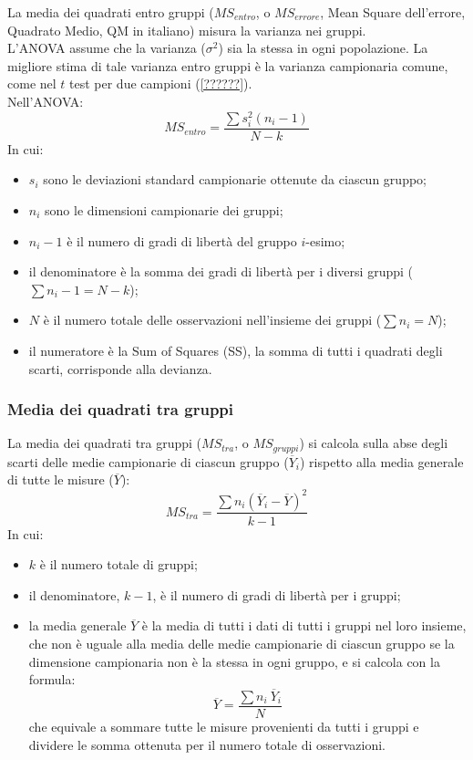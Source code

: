 \documentclass[10pt, draft]{book}
\newcommand{\tightlist}{%
\setlength{\itemsep}{1pt}\setlength{\parskip}{0pt}\setlength{\parsep}{0pt}}
\begin{document}
La media dei quadrati entro gruppi ($MS_{entro}$, o $MS_{errore}$, Mean Square dell'errore, Quadrato Medio, QM in italiano) misura la varianza nei gruppi.\\
L'ANOVA assume che la varianza ($\sigma^2$) sia la stessa in ogni popolazione. La migliore stima di tale varianza entro gruppi è la varianza campionaria comune, come nel $t$ test per due campioni (\ref{??????}).\\
Nell'ANOVA:
\begin{equation}
    MS_{entro} = \frac{\sum{s_i^2(n_i-1)}}{N-k}
\end{equation}
In cui:
\begin{itemize}\tightlist
    \item $s_i$ sono le deviazioni standard campionarie ottenute da ciascun gruppo;
    \item $n_i$ sono le dimensioni campionarie dei gruppi;
    \item $n_i - 1$ è il numero di gradi di libertà del gruppo $i$-esimo;
    \item il denominatore è la somma dei gradi di libertà per i diversi gruppi ($\sum{n_i - 1} = N-k$);
    \item $N$ è il numero totale delle osservazioni nell'insieme dei gruppi ($\sum{n_i = N}$);
    \item il numeratore è la Sum of Squares (SS), la somma di tutti i quadrati degli scarti, corrisponde alla devianza.
\end{itemize}

\subsubsection{Media dei quadrati tra gruppi}

La media dei quadrati tra gruppi ($MS_{tra}$, o $MS_{gruppi}$) si calcola sulla abse degli scarti delle medie campionarie di ciascun gruppo ($\overline{Y}_i$) rispetto alla media generale di tutte le misure ($\overline{Y}$):
\begin{equation}
    MS_{tra} = \frac{\sum{n_i(\overline{Y}_i-\overline{Y})^2}}{k-1}
\end{equation}
In cui:
\begin{itemize}\tightlist
    \item $k$ è il numero totale di gruppi;
    \item il denominatore, $k-1$, è il numero di gradi di libertà per i gruppi;
    \item la media generale $\overline{Y}$ è la media di tutti i dati di tutti i gruppi nel loro insieme, che non è uguale alla media delle medie campionarie di ciascun gruppo se la dimensione campionaria non è la stessa in ogni gruppo, e si calcola con la formula:
    \begin{equation}
        \overline{Y} = \frac{\sum{n_i\ \overline{Y}_i}}{N}
    \end{equation}
    che equivale a sommare tutte le misure provenienti da tutti i gruppi e dividere le somma ottenuta per il numero totale di osservazioni.
\end{itemize}
\end{document}
